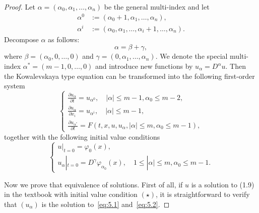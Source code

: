 \begin{proof}
  Let $\alpha = (\alpha_0,\alpha_1,\ldots,\alpha_n)$ be the general multi-index
  and let 
  \begin{align*}
    \alpha^0 & := (\alpha_0+1,\alpha_1,\ldots,\alpha_n), \\
    \alpha^i & := (\alpha_0,\alpha_1,\ldots,\alpha_i+1,\ldots,\alpha_n).
  \end{align*}
  Decompose $\alpha$ as follows:
  \[ \alpha = \beta + \gamma, \]
  where $\beta=(\alpha_0,0,\ldots,0)$ and $\gamma=(0,\alpha_1,\ldots,\alpha_n)$.
  We denote the special multi-index $\alpha^* = (m-1,0,\ldots,0)$
  and introduce new functions by $u_\alpha = D^\alpha u$.
  Then the Kowalevskaya type equation can be transformed into
  the following first-order system
  \begin{equation}\label{eq:5.1}
    \begin{cases}
      \frac{\partial u_\alpha}{\partial t} = u_{\alpha^0}, \quad |\alpha|\leq m-1, \alpha_0\leq m-2, \\
      \frac{\partial u_\alpha}{\partial x_i} = u_{\alpha^i}, \quad |\alpha|\leq m-1, \\
      \frac{\partial u_{\alpha^*}}{\partial t} = F(t,x,u,u_\alpha,|\alpha|\leq m, \alpha_0\leq m-1),
    \end{cases}
  \end{equation}
  together with the following initial value conditions
  \begin{equation}\label{eq:5.2}
    \begin{cases}
      u|_{t=0} = \varphi_0(x), \\
      u_\alpha|_{t=0} = D^\gamma \varphi_{\alpha_0}(x),\quad 1\leq |\alpha|\leq m, \alpha_0\leq m-1. 
    \end{cases}
  \end{equation}

  Now we prove that equivalence of solutions. First of all,
  if $u$ is a solution to (1.9) in the textbook with initial value condition $(\star)$,
  it is straightforward to verify that $(u_\alpha)$ is the solution to~\eqref{eq:5.1} 
  and~\eqref{eq:5.2}.


\end{proof}

